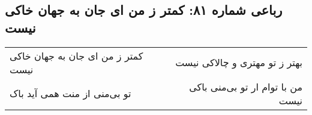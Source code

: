 \begin{center}
\section*{رباعی شماره ۸۱: کمتر ز من ای جان به جهان خاکی نیست}
\label{sec:sh081}
\begin{longtable}{l p{0.5cm} r}
کمتر ز من ای جان به جهان خاکی نیست
&&
بهتر ز تو مهتری و چالاکی نیست
\\
تو بی‌منی از منت همی آید باک
&&
من با توام ار تو بی‌منی باکی نیست
\\
\end{longtable}
\end{center}
